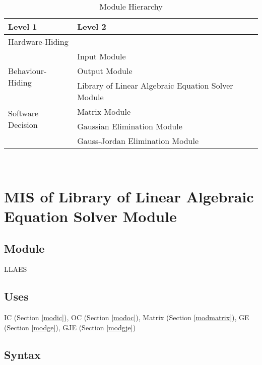 \documentclass[12pt, titlepage]{article}
\begin{document}
\begin{table}[h!]
\centering
\begin{tabular}{p{} p{}}
\toprule
\textbf{Level 1} & \textbf{Level 2}\\
\midrule

{Hardware-Hiding} & ~ \\
\midrule

\multirow{3}{0.3\textwidth}{Behaviour-Hiding} 
& Input Module\\
& Output Module\\
& Library of Linear Algebraic Equation Solver Module\\


\midrule

\multirow{2}{0.3\textwidth}{Software Decision}  
& Matrix Module\\

& Gaussian Elimination Module\\

& Gauss-Jordan Elimination Module\\


\bottomrule

\end{tabular}
\caption{Module Hierarchy}
\label{TblMH}
\end{table}

\newpage
~\newpage

\section{MIS of {Library of Linear Algebraic Equation Solver Module}} \label{modllaes} %

\subsection{Module}

LLAES


\subsection{Uses}
IC (Section \ref{modic}), OC (Section \ref{modoc}), Matrix (Section \ref{modmatrix}), GE (Section \ref{modge}), GJE (Section \ref{modgje})


\subsection{Syntax}
\end{document}
